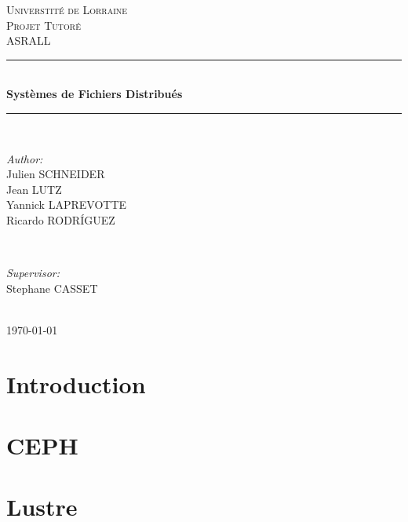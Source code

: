 \documentclass[12pt]{article}
\begin{document}
\begin{titlepage}
\newcommand{\HRule}{\rule{\linewidth}{0.5mm}}
\center

\textsc{\LARGE Universtité de Lorraine}\\[1.5cm]
\textsc{\Large Projet Tutoré}\\[0.5cm]
\textsc{\large ASRALL}\\[0.5cm]

\HRule \\[0.4cm]
{ \huge \bfseries Systèmes de Fichiers Distribués}\\[0.4cm]
\HRule \\[1.5cm]

\begin{minipage}{0.4\textwidth}
\begin{flushleft} \large
\emph{Author:}\\
Julien \textsc{SCHNEIDER}\\
Jean \textsc{LUTZ}\\
Yannick \textsc{LAPREVOTTE}\\
Ricardo \textsc{RODRÍGUEZ}\\
\end{flushleft}
\end{minipage}
~
\begin{minipage}{0.4\textwidth}
\begin{flushright} \large
\emph{Supervisor:} \\
 Stephane \textsc{CASSET}
\end{flushright}
\end{minipage}\\[4cm]

{\large \today}\\[3cm]


\vfill

\end{titlepage}


\tableofcontents

\newpage 

\section{Introduction} 
\section{CEPH}
\newpage
\section{Lustre}
\end{document}
